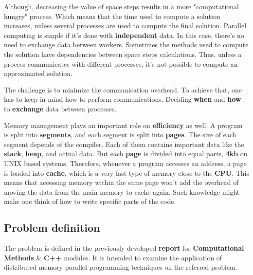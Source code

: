 \documentclass[12pt]{article}
\begin{document}
\par Although, decreasing the value of space steps results in a more "computational hungry" process. Which means that the time used to compute a solution increases, unless several processes are used to compute the final solution. Parallel computing is simple if it's done with \textbf{independent} data. In this case, there's no need to exchange data between workers. Sometimes the methods used to compute the solution have dependencies between space steps calculations. Thus, unless a process communicates with different processes, it's not possible to compute an approximated solution. 

\par The challenge is to minimize the communication overhead. To achieve that, one has to keep in mind how to perform communications. Deciding \textbf{when} and \textbf{how} to \textbf{exchange} data between processes.

\par Memory management plays an important role on \textbf{efficiency} as well. A program is split into \textbf{segments}, and each segment is split into \textbf{pages}. The size of each segment depends of the compiler. Each of them contains important data like the \textbf{stack}, \textbf{heap}, and actual data. But each \textbf{page} is divided into equal parts, \textbf{4kb} on UNIX based systems. Therefore, whenever a program accesses an address, a page is loaded into \textbf{cache}, which is a very fast type of memory close to the \textbf{CPU}. This means that accessing memory within the same page won't add the overhead of moving the data from the main memory to cache again. Such knowledge might make one think of how to write specific parts of the code.  

\subsection*{Problem definition}

The problem is defined in the previously developed \textbf{report}\cite{fraga} for \textbf{Computational Methods} \& \textbf{C++} modules. It is intended to examine the application of distributed memory parallel programming techniques on the referred problem.
\end{document}
